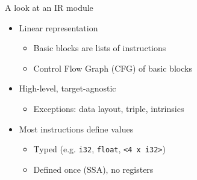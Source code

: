 \begin{frame}[fragile]{A look at an IR module}

\begin{itemize}
    \item Linear representation
    \begin{itemize}
        \item Basic blocks are lists of instructions
        \item Control Flow Graph (CFG) of basic blocks
    \end{itemize}
    \item High-level, target-agnostic
    \begin{itemize}
        \item Exceptions: data layout, triple, intrinsics
    \end{itemize}
    \item Most instructions define values
    \begin{itemize}
        \item Typed (e.g. \texttt{i32}, \texttt{float}, \texttt{<4 x i32>})
        \item Defined once (SSA), no registers
    \end{itemize}
\end{itemize}



\end{frame}


